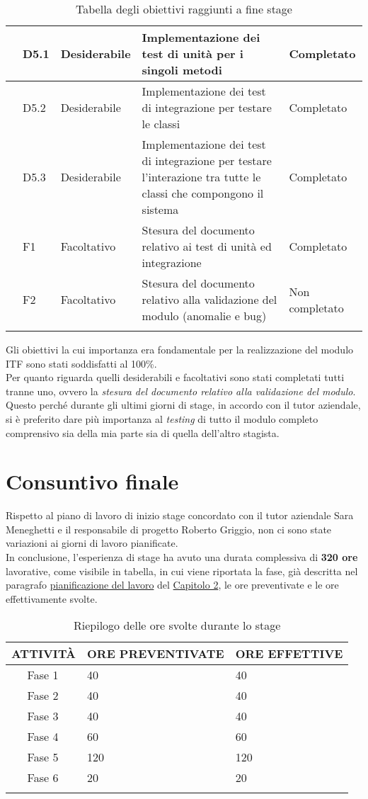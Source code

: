 \begin{longtable}{|r l|p{3cm}|p{8cm}|p{2cm}|}
	& D5.1 & Desiderabile & Implementazione dei test di unità per i singoli metodi & Completato\\\hline
	& D5.2 & Desiderabile & Implementazione dei test di integrazione per testare le classi & Completato\\\hline
	& D5.3 & Desiderabile & Implementazione dei test di integrazione per testare l'interazione tra tutte le classi che compongono il sistema & Completato\\\hline
	& F1 & Facoltativo & Stesura del documento relativo ai test di unità ed integrazione & Completato\\\hline	
	& F2 & Facoltativo & Stesura del documento relativo alla validazione del modulo (anomalie e bug) & Non completato\\\hline
	\caption{Tabella degli obiettivi raggiunti a fine stage}
\end{longtable}
Gli obiettivi la cui importanza era fondamentale per la realizzazione del modulo \gls{ITF} sono stati soddisfatti al 100\%.\\
Per quanto riguarda quelli desiderabili e facoltativi sono stati completati tutti tranne uno, ovvero la\textit{ stesura del documento relativo alla validazione del modulo}. Questo perché durante gli ultimi giorni di stage, in accordo con il tutor aziendale, si è preferito dare più importanza al \textit{testing} di tutto il modulo completo comprensivo sia della mia parte sia di quella dell'altro stagista.
\section{Consuntivo finale}
Rispetto al piano di lavoro di inizio stage concordato con il tutor aziendale Sara Meneghetti e il responsabile di progetto Roberto Griggio, non ci sono state variazioni ai giorni di lavoro pianificate.\\
In conclusione, l'esperienza di stage ha avuto una durata complessiva di \textbf{320 ore} lavorative, come visibile in tabella, in cui viene riportata la fase, già descritta nel paragrafo \hyperref[sec:pianificazione_del_lavoro]{pianificazione del lavoro} del \hyperref[cap:tecnologie_e_strumenti]{Capitolo 2}, le ore preventivate e le ore effettivamente svolte. 
\begin{longtable}{|r l|p{5cm}|p{4cm}|}
	\hline
	\multicolumn{2}{|c|}{\textbf{ATTIVITÀ}} & \textbf{ORE PREVENTIVATE} & \textbf{ORE EFFETTIVE}\tabularnewline
	\hline
	& Fase 1 & \centerline{40} & \centerline{40} \\\hline	
	& Fase 2 & \centerline{40} & \centerline{40}\\\hline
	& Fase 3 & \centerline{40} & \centerline{40}\\\hline
	& Fase 4 & \centerline{60} & \centerline{60}\\\hline
	& Fase 5 & \centerline{120} & \centerline{120}\\\hline
	& Fase 6 & \centerline{20} & \centerline{20}\\\hline	
	\caption{Riepilogo delle ore svolte durante lo stage}
\end{longtable}
